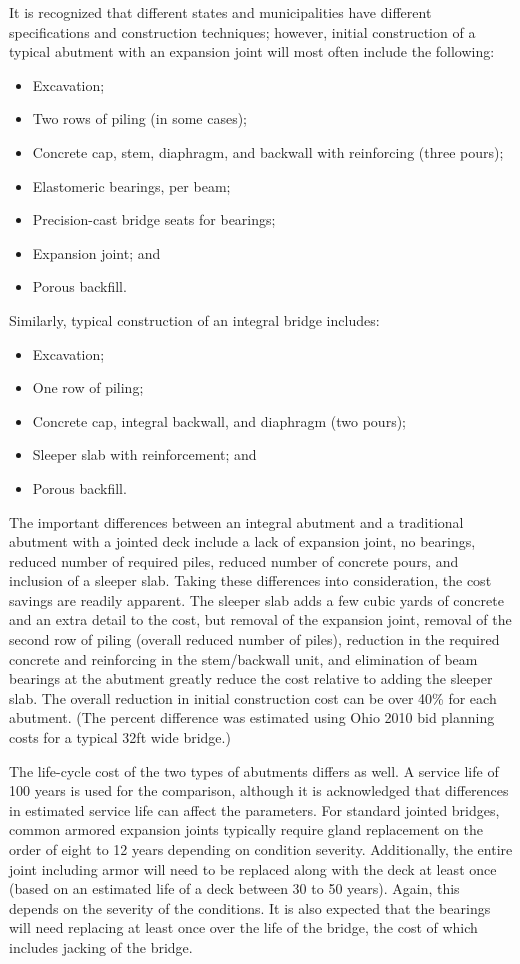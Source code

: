 It is recognized that different states and municipalities have different specifications and construction techniques;
however, initial construction of a typical abutment with an expansion joint will most often include the following:

\begin{itemize}
  \item Excavation;
  \item Two rows of piling (in some cases);
  \item Concrete cap, stem, diaphragm, and backwall with reinforcing (three pours);
  \item Elastomeric bearings, per beam;
  \item Precision-cast bridge seats for bearings;
  \item Expansion joint; and
  \item Porous backfill.
\end{itemize}

Similarly, typical construction of an integral bridge includes:

\begin{itemize}
  \item Excavation;
  \item One row of piling;
  \item Concrete cap, integral backwall, and diaphragm (two pours);
  \item Sleeper slab with reinforcement; and
  \item Porous backfill.
\end{itemize}

The important differences between an integral abutment and a traditional abutment with a jointed deck include a
lack of expansion joint, no bearings, reduced number of required piles, reduced number of concrete pours, and
inclusion of a sleeper slab. Taking these differences into consideration, the cost savings are readily apparent. The
sleeper slab adds a few cubic yards of concrete and an extra detail to the cost, but removal of the expansion joint,
removal of the second row of piling (overall reduced number of piles), reduction in the required concrete and
reinforcing in the stem/backwall unit, and elimination of beam bearings at the abutment greatly reduce the cost
relative to adding the sleeper slab. The overall reduction in initial construction cost can be over 40\% for each
abutment. (The percent difference was estimated using Ohio 2010 bid planning costs for a typical 32ft wide bridge.)

The life-cycle cost of the two types of abutments differs as well. A service life of 100 years is used for the
comparison, although it is acknowledged that differences in estimated service life can affect the parameters. For
standard jointed bridges, common armored expansion joints typically require gland replacement on the order of eight
to 12 years depending on condition severity. Additionally, the entire joint including armor will need to be replaced
along with the deck at least once (based on an estimated life of a deck between 30 to 50 years). Again, this depends on
the severity of the conditions. It is also expected that the bearings will need replacing at least once over the life of the
bridge, the cost of which includes jacking of the bridge.


